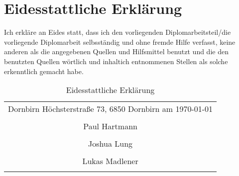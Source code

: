 \section*{Eidesstattliche Erklärung}

Ich erkläre an Eides statt, dass ich den vorliegenden Diplomarbeitsteil/die vorliegende Diplomarbeit selbsständig und ohne fremde Hilfe verfasst, keine anderen als die angegebenen Quellen und Hilfsmittel benutzt und die den benutzten Quellen wörtlich und inhaltich entnommenen Stellen als solche erkenntlich gemacht habe.

\bigskip

\begin{table}[H]
  \centering
  \begin{tabular}{c}
    Dornbirn Höchsterstraße 73, 6850 Dornbirn am \today \\
    \\ [10ex]

    \hline
    Paul Hartmann                                       \\
    \\ [10ex]

    \hline
    Joshua Lung                                         \\
    \\ [10ex]

    \hline
    Lukas Madlener                                      \\
    \\ [10ex]
  \end{tabular}
  \caption{Eidesstattliche Erklärung}
  \label{tab:eidesstaatliche_erklärung}
\end{table}